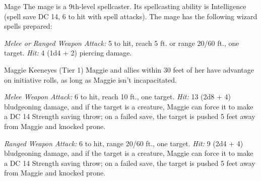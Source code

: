\documentclass[10pt,a4paper,twoside,bg=print,twocolumn,openany,nodeprecatedcode]{dndbook}
\begin{document}
\begin{DndMonster}[float=t]{Mage}
\DndMonsterBasics[
armor-class = {12 (15 with \textit{mage armor})},
hit-points = {\DndDice{9d8}},
speed = {30 ft.}
]
\DndMonsterAbilityScores[
 str = 9,
 dex = 14,
 con = 11,
 int = 17,
 wis = 12,
 cha = 11
]
\DndMonsterDetails[
saving-throws = {Int +6, Wis +4},
skills = {Arcana +6, History +6},
languages = {any four languages},
challenge = 6,
]
The mage is a 9th-level spellcaster. Its spellcasting ability is Intelligence (spell save DC 14, 6 to hit with spell attacks). The mage has the following wizard spells prepared:
\begin{DndMonsterSpells}
\end{DndMonsterSpells}
\textsl{Melee or Ranged Weapon Attack:} 5 to hit, reach 5 ft. or range 20/60 ft., one target. \textsl{Hit:} 4 (1d4 + 2) piercing damage.

\end{DndMonster}


\clearpage

\begin{DndMonster}[float=t]{Maggie Keeneyes (Tier 1)}
\DndMonsterBasics[
armor-class = {13 (\textit{leather armor})},
hit-points = {\DndDice{10d10 + 30}},
speed = {30 ft.}
]
\DndMonsterAbilityScores[
 str = 18,
 dex = 14,
 con = 16,
 int = 14,
 wis = 14,
 cha = 8
]
\DndMonsterDetails[
saving-throws = {Str +6, Con +5},
skills = {Athletics +6, Insight +4, Perception +4, Persuasion +3},
senses = {darkvision 60 ft., passive perception 14},
languages = {Common, Giant},
challenge = 3,
]
Maggie and allies within 30 feet of her have advantage on initiative rolls, as long as Maggie isn't incapacitated.

\textsl{Melee Weapon Attack:} 6 to hit, reach 10 ft., one target. \textsl{Hit:} 13 (2d8 + 4) bludgeoning damage, and if the target is a creature, Maggie can force it to make a DC 14 Strength saving throw; on a failed save, the target is pushed 5 feet away from Maggie and knocked prone.

\textsl{Ranged Weapon Attack:} 6 to hit, range 20/60 ft., one target. \textsl{Hit:} 9 (2d4 + 4) bludgeoning damage, and if the target is a creature, Maggie can force it to make a DC 14 Strength saving throw; on a failed save, the target is pushed 5 feet away from Maggie and knocked prone.

\end{DndMonster}
\end{document}
